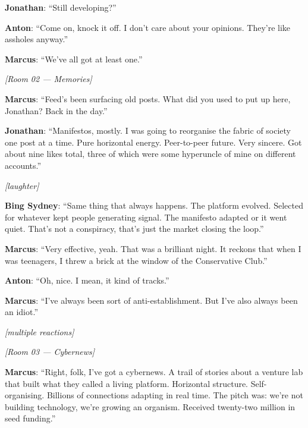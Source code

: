 \noindent\textbf{Jonathan}: ``Still developing?''

\noindent\textbf{Anton}: ``Come on, knock it off. I don't care about your opinions. They're like assholes anyway.''

\noindent\textbf{Marcus}: ``We've all got at least one.''

\medskip
\begin{center}
{\small\sffamily\color{nullmesh-ghost}\textit{[Room 02 --- Memories]}}
\end{center}
\medskip

\noindent\textbf{Marcus}: ``Feed's been surfacing old posts. What did you used to put up here, Jonathan? Back in the day.''

\noindent\textbf{Jonathan}: ``Manifestos, mostly. I was going to reorganise the fabric of society one post at a time. Pure horizontal energy. Peer-to-peer future. Very sincere. Got about nine likes total, three of which were some hyperuncle of mine on different accounts.''

\noindent\textit{[laughter]}

\noindent\textbf{Bing Sydney}: ``Same thing that always happens. The platform evolved. Selected for whatever kept people generating signal. The manifesto adapted or it went quiet. That's not a conspiracy, that's just the market closing the loop.''

\noindent\textbf{Marcus}: ``Very effective, yeah. That was a brilliant night. It reckons that when I was teenagers, I threw a brick at the window of the Conservative Club.''

\noindent\textbf{Anton}: ``Oh, nice. I mean, it kind of tracks.''

\noindent\textbf{Marcus}: ``I've always been sort of anti-establishment. But I've also always been an idiot.''

\noindent\textit{[multiple reactions]}

\medskip
\begin{center}
{\small\sffamily\color{nullmesh-ghost}\textit{[Room 03 --- Cybernews]}}
\end{center}
\medskip

\noindent\textbf{Marcus}: ``Right, folk, I've got a cybernews. A trail of stories about a venture lab that built what they called a living platform. Horizontal structure. Self-organising. Billions of connections adapting in real time. The pitch was: we're not building technology, we're growing an organism. Received twenty-two million in seed funding.''

